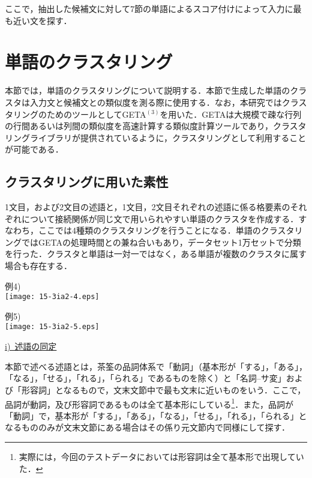 \documentclass[japanese]{jnlp_1.4}
\begin{document}
ここで，抽出した候補文に対して7節の単語によるスコア付けによって入力に最も近い文を探す．


\section{単語のクラスタリング}

本節では，単語のクラスタリングについて説明する．本節で生成した単語のクラスタは入力文と候補文との類似度を測る際に使用する．なお，本研究ではクラスタリングのためのツールとしてGETA$^{(3)}$を用いた．GETAは大規模で疎な行列の行間あるいは列間の類似度を高速計算する類似度計算ツールであり，クラスタリングライブラリが提供されているように，クラスタリングとして利用することが可能である．

\subsection{クラスタリングに用いた素性}

1文目，および2文目の述語と，1文目，2文目それぞれの述語に係る格要素のそれぞれについて接続関係が同じ文で用いられやすい単語のクラスタを作成する．すなわち，ここでは4種類のクラスタリングを行うことになる．単語のクラスタリングではGETAの処理時間との兼ね合いもあり，データセット1万セットで分類を行った．クラスタと単語は一対一ではなく，ある単語が複数のクラスタに属す場合も存在する．



\vspace{\baselineskip}
\begin{minipage}{183pt}
例4) \\
\texttt{[image: 15-3ia2-4.eps]}
\end{minipage}
\hspace{2zw}
\begin{minipage}{165pt}
例5)\\
\texttt{[image: 15-3ia2-5.eps]}
\end{minipage}
\vspace{\baselineskip}



\noindent
\ul{\mbox{i) 述語の同定}}

本節で述べる述語とは，茶筌の品詞体系で「動詞」（基本形が「する」，「ある」，「なる」，「せる」，「れる」，「られる」であるものを除く）と「名詞--サ変」および「形容詞」となるもので，文末文節中で最も文末に近いものをいう．ここで，品詞が動詞，及び形容詞であるものは全て基本形にしている\footnote{
	実際には，今回のテストデータにおいては形容詞は全て基本形で出現していた．
}．また，品詞が「動詞」で，基本形が「する」，「ある」，「なる」，「せる」，「れる」，「られる」となるもののみが文末文節にある場合はその係り元文節内で同様にして探す．
\end{document}
